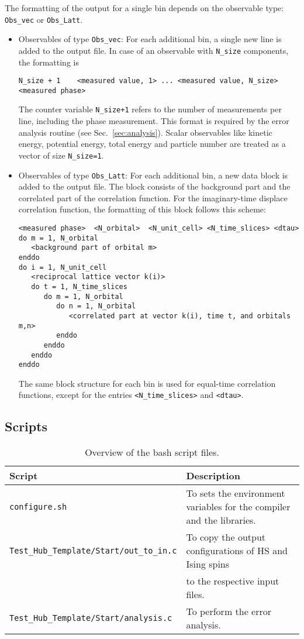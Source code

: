 The formatting of the output for a single bin depends on the observable type: \texttt{Obs\_vec} or \texttt{Obs\_Latt}.
\begin{itemize}
\item Observables of type \texttt{Obs\_vec}:
For each additional bin, a single new line is added to the output file.
In case of an observable with \texttt{N\_size} components, the formatting is 
\begin{verbatim}
N_size + 1    <measured value, 1> ... <measured value, N_size>    <measured phase>
\end{verbatim}
The counter variable \texttt{N\_size+1} refers to the number of measurements per line, including the phase measurement. 
This format is required by the error analysis routine (see Sec.~\ref{sec:analysis}). 
Scalar observables like kinetic energy, potential energy, total energy and particle number are treated as a vector 
of size \texttt{N\_size=1}.

\item Observables of type \texttt{Obs\_Latt}:
For each additional bin, a new data block is added to the output file. 
The block consists of the background part and the correlated part of the correlation function.
For the imaginary-time displace correlation function, the formatting of this block follows this scheme:
\begin{verbatim}
<measured phase>  <N_orbital>  <N_unit_cell> <N_time_slices> <dtau>
do m = 1, N_orbital
   <background part of orbital m>
enddo
do i = 1, N_unit_cell
   <reciprocal lattice vector k(i)>
   do t = 1, N_time_slices
      do m = 1, N_orbital
         do n = 1, N_orbital
            <correlated part at vector k(i), time t, and orbitals m,n>
         enddo
      enddo
   enddo
enddo
\end{verbatim}
The same block structure for each bin is used for equal-time correlation functions, except for the entries  \texttt{<N\_time\_slices>} and \texttt{<dtau>}.

\end{itemize}

\subsection{Scripts}\label{sec:scripts}
%
\begin{table}[h]
   \begin{tabular}{l l}
   Script & Description \\\hline
   \texttt{configure.sh} & To sets the environment variables for the compiler and the libraries.\\
   \texttt{Test\_Hub\_Template/Start/out\_to\_in.c} & To copy the output configurations of HS and Ising spins\\
   & to the respective input files. \\
   \texttt{Test\_Hub\_Template/Start/analysis.c} & To perform the error analysis.
   \end{tabular}
   \caption{Overview of the bash script files. \label{table:scripts}}
\end{table}
%